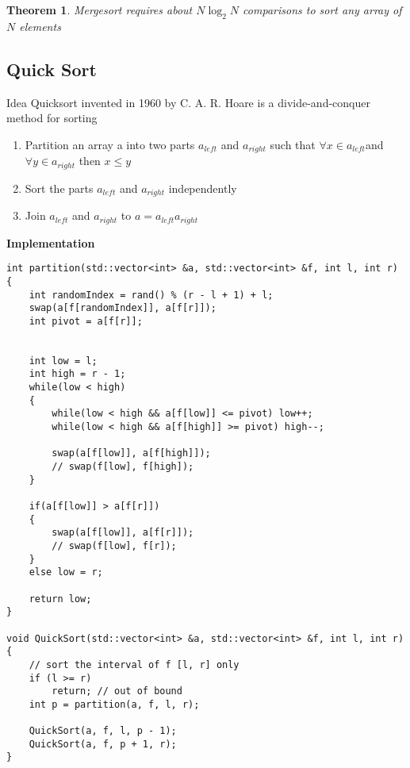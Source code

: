\documentclass{article}
\newtheorem*{theorem}{Theorem}
\begin{document}
\begin{theorem}
 Mergesort requires about $N \log_2 N$ comparisons to sort any array of $N$ elements
\end{theorem}

\subsection{Quick Sort}
Idea
Quicksort invented in 1960 by C. A. R. Hoare is a divide-and-conquer method for sorting 
\begin{enumerate}
    \item Partition an array a into two parts $a_{left}$ and $a_{right}$ such that $\forall x \in a_{left}$and $\forall y \in a_{right}$ then $x \leq y$
    \item Sort the parts $a_{left}$ and $a_{right}$ independently
    \item Join $a_{left}$ and $a_{right}$ to $a = a_{left} a_{right}$
\end{enumerate}

\textbf{Implementation}
\begin{verbatim}
int partition(std::vector<int> &a, std::vector<int> &f, int l, int r)
{
    int randomIndex = rand() % (r - l + 1) + l;
    swap(a[f[randomIndex]], a[f[r]]);
    int pivot = a[f[r]];


    int low = l;
    int high = r - 1;
    while(low < high)
    {
        while(low < high && a[f[low]] <= pivot) low++;
        while(low < high && a[f[high]] >= pivot) high--;

        swap(a[f[low]], a[f[high]]);
        // swap(f[low], f[high]);
    }

    if(a[f[low]] > a[f[r]])
    {
        swap(a[f[low]], a[f[r]]);
        // swap(f[low], f[r]);
    }
    else low = r;

    return low;
}

void QuickSort(std::vector<int> &a, std::vector<int> &f, int l, int r)
{
    // sort the interval of f [l, r] only
    if (l >= r)
        return; // out of bound
    int p = partition(a, f, l, r);

    QuickSort(a, f, l, p - 1);
    QuickSort(a, f, p + 1, r);
}
\end{verbatim}
\end{document}

